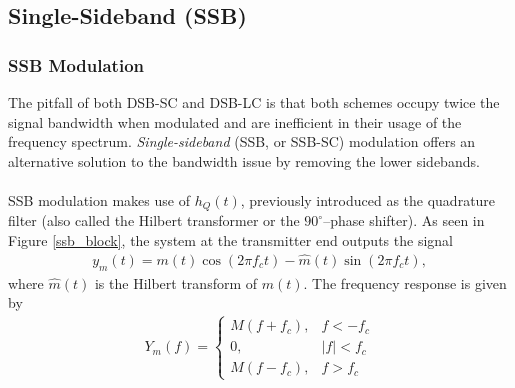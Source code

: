 \documentclass{report}
\begin{document}
\subsection{Single-Sideband (SSB)}
\subsubsection{SSB Modulation}
The pitfall of both DSB-SC and DSB-LC is that both schemes occupy twice the signal bandwidth when modulated and are inefficient in their usage of 
the frequency spectrum. \emph{Single-sideband} (SSB, or SSB-SC) modulation offers an alternative solution to the bandwidth issue by removing the lower sidebands. 
\\ \\
SSB modulation makes use of $h_Q(t)$, previously introduced as the quadrature filter (also called the Hilbert transformer or the $90^{\circ}$--phase shifter).
As seen in Figure \ref{ssb_block}, the system at the transmitter end outputs the signal 
\begin{align}
    y_m(t) = m(t)\cos(2\pi f_c t) - \hat{m}(t)\sin(2\pi f_c t),
\end{align}
where $\hat{m}(t)$ is the Hilbert transform of $m(t)$. The frequency response is given by 
\begin{align}
    Y_m(f) = 
    \begin{cases}
        M(f+f_c), & f<-f_c \\
        0, & |f|<f_c \\ 
        M(f-f_c), & f>f_c
    \end{cases}
\end{align}
\end{document}
